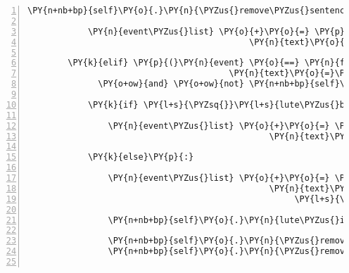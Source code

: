 \begin{Verbatim}[commandchars=\\\{\},numbers=left,firstnumber=1,stepnumber=1]
            \PY{n+nb+bp}{self}\PY{o}{.}\PY{n}{\PYZus{}remove\PYZus{}sentence}\PY{p}{(}\PY{n}{ID\PYZus{}CASSANDRA}\PY{p}{,} \PY{n}{event}\PY{o}{.}\PY{n}{text}\PY{p}{)}

            \PY{n}{event\PYZus{}list} \PY{o}{+}\PY{o}{=} \PY{p}{[}\PY{n}{fabula}\PY{o}{.}\PY{n}{SaysEvent}\PY{p}{(}\PY{n}{identifier}\PY{o}{=}\PY{n}{ID\PYZus{}KUNI}\PY{p}{,}
                                            \PY{n}{text}\PY{o}{=}\PY{l+s}{\PYZsq{}}\PY{l+s}{Nein Danke!}\PY{l+s}{\PYZsq{}}\PY{p}{)}\PY{p}{]}

        \PY{k}{elif} \PY{p}{(}\PY{n}{event} \PY{o}{==} \PY{n}{fabula}\PY{o}{.}\PY{n}{SaysEvent}\PY{p}{(}\PY{n}{identifier}\PY{o}{=}\PY{n}{ID\PYZus{}KUNI}\PY{p}{,}
                                        \PY{n}{text}\PY{o}{=}\PY{l+s}{\PYZsq{}}\PY{l+s}{Ich habe eine Saite von einer Harfe.}\PY{l+s}{\PYZsq{}}\PY{p}{)}
              \PY{o+ow}{and} \PY{o+ow}{not} \PY{n+nb+bp}{self}\PY{o}{.}\PY{n}{lute\PYZus{}is\PYZus{}repaired}\PY{p}{)}\PY{p}{:}

            \PY{k}{if} \PY{l+s}{\PYZsq{}}\PY{l+s}{lute\PYZus{}broken}\PY{l+s}{\PYZsq{}} \PY{o+ow}{not} \PY{o+ow}{in} \PY{n+nb+bp}{self}\PY{o}{.}\PY{n}{host}\PY{o}{.}\PY{n}{rack}\PY{o}{.}\PY{n}{entity\PYZus{}dict}\PY{o}{.}\PY{n}{keys}\PY{p}{(}\PY{p}{)}\PY{p}{:}

                \PY{n}{event\PYZus{}list} \PY{o}{+}\PY{o}{=} \PY{p}{[}\PY{n}{fabula}\PY{o}{.}\PY{n}{SaysEvent}\PY{p}{(}\PY{n}{identifier}\PY{o}{=}\PY{n}{ID\PYZus{}CASSANDRA}\PY{p}{,}
                                                \PY{n}{text}\PY{o}{=}\PY{l+s}{\PYZsq{}}\PY{l+s}{Vielleicht kann man die noch gebrauchen.}\PY{l+s}{\PYZsq{}}\PY{p}{)}\PY{p}{]}

            \PY{k}{else}\PY{p}{:}

                \PY{n}{event\PYZus{}list} \PY{o}{+}\PY{o}{=} \PY{p}{[}\PY{n}{fabula}\PY{o}{.}\PY{n}{SaysEvent}\PY{p}{(}\PY{n}{identifier}\PY{o}{=}\PY{n}{ID\PYZus{}CASSANDRA}\PY{p}{,}
                                                \PY{n}{text}\PY{o}{=}\PY{l+s}{\PYZsq{}}\PY{l+s}{Ich habe ein Laute ohne Saiten. }\PY{l+s}{\PYZsq{}}
                                                     \PY{l+s}{\PYZsq{}}\PY{l+s}{Vielleicht können wir sie damit reparieren.}\PY{l+s}{\PYZsq{}}\PY{p}{)}\PY{p}{]}

                \PY{n+nb+bp}{self}\PY{o}{.}\PY{n}{lute\PYZus{}is\PYZus{}repaired} \PY{o}{=} \PY{n+nb+bp}{True}

                \PY{n+nb+bp}{self}\PY{o}{.}\PY{n}{\PYZus{}remove\PYZus{}sentence}\PY{p}{(}\PY{n}{ID\PYZus{}CASSANDRA}\PY{p}{,} \PY{l+s}{\PYZsq{}}\PY{l+s}{Ich habe eine Laute. Leider ist sie kaputt.}\PY{l+s}{\PYZsq{}}\PY{p}{)}
                \PY{n+nb+bp}{self}\PY{o}{.}\PY{n}{\PYZus{}remove\PYZus{}sentence}\PY{p}{(}\PY{n}{ID\PYZus{}KUNI}\PY{p}{,} \PY{n}{event}\PY{o}{.}\PY{n}{text}\PY{p}{)}


\end{Verbatim}
